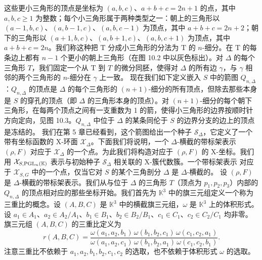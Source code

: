 这些更小三角形的顶点是坐标为 $(a,b,c)$、$a+b+c=2n+1$ 的点，其中 $a,b,c\ge1$ 为整数；每个小三角形属于两种类型之一：朝上的三角形以 $(a-1,b,c)$、$(a,b-1,c)$、$(a,b,c-1)$ 为顶点，其中 $a+b+c=2n+2$；朝下的三角形以 $(a+1,b,c)$、$(a,b+1,c)$、$(a,b,c+1)$ 为顶点，其中 $a+b+c=2n$。我们称这种把 $\mathrm{T}$ 分成小三角形的分法为 $\mathrm{T}$ 的 $n$-细分。在 $\mathrm{T}$ 的每条边上都有 $n-1$ 个更小的朝上三角形（在图 10.2 中以灰色标出）。对 $\Delta$ 的每个三角形 $T$，我们固定一个从 $\mathrm{T}$ 到 $T$ 的微分同胚，使得对 $\Delta$ 的所有边 $\gamma$，与 $\gamma$ 相邻的两个三角形的 $n$-细分在 $\gamma$ 上一致。
现在我们如下定义嵌入 $S$ 中的箭图 $Q_{n,\Delta}$：$Q_{n,\Delta}$ 的顶点是 $\Delta$ 的每个三角形的 $(n+1)$-细分的所有顶点，但除去那些本身是 $S$ 的穿孔的顶点（即 $\Delta$ 的三角形本身的顶点）。对 $(n+1)$-细分的每个朝下三角形，在每两个顶点之间有一支重数为 1 的箭，使得小三角形的边界按顺时针方向定向，见图 10.3。$Q_{n,\Delta}$ 中位于 $\Delta$ 的某条同伦于 $S$ 的边界分支的边上的顶点是冻结的。
我们在第 5 章已经看到，这个箭图给出一个种子 $\mathcal{S}_\Delta$，它定义了一个带有坐标函数的 X-环面 $\mathcal{X}_\Delta$。下面我们将说明，一个 $\Delta$-横截的带标架表示 $(\rho,F)$ 对应于 $\mathcal{X}_\Delta$ 的一个点。为此我们将构造对应于 $(\rho,F)$ 的 X-坐标。我们用 $\mathcal{X}_{S,\operatorname{PGL}_n(\mathbb{K})}$ 表示与初始种子 $\mathcal{S}_\Delta$ 相关联的 X-簇代数簇。一个带标架表示
对应于 $\mathcal{X}_{S,G}$ 中的一个点，仅当它对 $S$ 的某个三角剖分 $\Delta$ 是 $\Delta$-横截的。
设 $(\rho,F)$ 是 $\Delta$-横截的带标架表示。我们从与位于 $\Delta$ 的三角形 $T$（顶点为 $p_1,p_2,p_3$）内部的 $Q_{n,\Delta}$ 的顶点相对应的那些坐标开始。我们首先为 $\mathbb{K}^3$ 中的旗三元组定义一个称为三重比的概念。设 $(A,B,C)$ 是 $\mathbb{K}^3$ 中的横截旗三元组，$\omega$ 是 $\mathbb{K}^3$ 上的体积形式。设 $a_1\in A_1$、$a_2\in A_2/A_1$、$b_1\in B_1$、$b_2\in B_2/B_1$、$c_1\in C_1$、$c_2\in C_2/C_1$ 均非零。旗三元组 $(A,B,C)$ 的三重比定义为
\[
r(A,B,C) = \frac{\omega(a_1,a_2,b_1)\,\omega(b_1,b_2,c_1)\,\omega(c_1,c_2,a_1)}{\omega(a_1,a_2,c_1)\,\omega(b_1,b_2,a_1)\,\omega(c_1,c_2,b_1)}.
\]
注意三重比不依赖于 $a_1,a_2,b_1,b_2,c_1,c_2$ 的选取，也不依赖于体积形式 $\omega$ 的选取。


